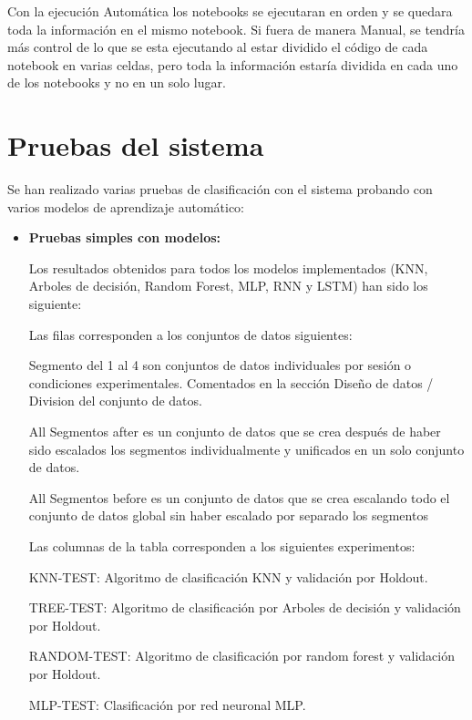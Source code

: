 Con la ejecución Automática los notebooks se ejecutaran en orden y se quedara toda la información en el mismo notebook.
Si fuera de manera Manual, se tendría más control de lo que se esta ejecutando al estar dividido el código de cada notebook en varias celdas, pero toda la información estaría dividida en cada uno de los notebooks y no en un solo lugar.



\section{Pruebas del sistema}


Se han realizado varias pruebas de clasificación con el sistema probando con varios modelos de aprendizaje automático:

\begin{itemize}
	\item
	\textbf{Pruebas simples con modelos:}

	Los resultados obtenidos para todos los modelos implementados (KNN, Arboles de decisión, Random Forest, MLP, RNN y LSTM) han sido los siguiente:
	

	Las filas corresponden a los conjuntos de datos siguientes: 
	
	Segmento del 1 al 4 son conjuntos de datos individuales por sesión o condiciones experimentales. Comentados en la sección Diseño de datos / Division del conjunto de datos.
	
	All Segmentos after es un conjunto de datos que se crea después de haber sido escalados los segmentos individualmente y unificados en un solo conjunto de datos.

	All Segmentos before es un conjunto de datos que se crea escalando todo el conjunto de datos global sin haber escalado por separado los segmentos
	
	Las columnas de la tabla corresponden a los siguientes experimentos:
	
	KNN-TEST: Algoritmo de clasificación KNN y validación por Holdout.
	
	TREE-TEST: Algoritmo de clasificación por Arboles de decisión y validación por Holdout.

	RANDOM-TEST: Algoritmo de clasificación por random forest y validación por Holdout.

	MLP-TEST: Clasificación por red neuronal MLP.


\end{itemize}
